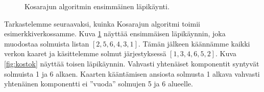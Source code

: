 \begin{figure}
\begin{center}
\end{center}
\caption{Kosarajun algoritmin ensimmäinen läpikäynti.}
\label{fig:koseka}
\end{figure}

Tarkastelemme seuraavaksi, kuinka Kosarajun algoritmi
toimii esimerkkiverkossamme.
Kuva \ref{fig:koseka} näyttää ensimmäisen läpikäynnin,
joka muodostaa solmuista listan $[2,5,6,4,3,1]$.
Tämän jälkeen käännämme kaikki verkon kaaret ja
käsittelemme solmut järjestyksessä $[1,3,4,6,5,2]$.
Kuva \ref{fig:kostok} näyttää toisen läpikäynnin.
Vahvasti yhtenäiset komponentit syntyvät
solmuista 1 ja 6 alkaen.
Kaarten kääntämisen ansiosta
solmusta 1 alkava
vahvasti yhtenäinen komponentti ei ''vuoda''
solmujen 5 ja 6 alueelle.

